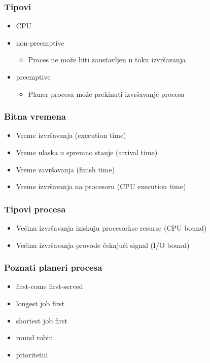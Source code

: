 \documentclass{beamer}
\begin{document}
\begin{frame}
    \frametitle{Tipovi}
    \begin{itemize}
        \item CPU \newline
        \item non-preemptive \begin{itemize}
            \item Proces ne može biti zaustavljen u toku izvršavanja \newline
        \end{itemize}
        \item preemptive \begin{itemize}
            \item Planer procesa može prekinuti izvršavanje procesa
        \end{itemize}
    \end{itemize}
\end{frame}

\begin{frame}
    \frametitle{Bitna vremena}
    \begin{itemize}
        \item Vreme izvršavanja (execution time) \newline
        \item Vreme ulaska u spremno stanje (arrival time) \newline
        \item Vreme završavanja (finish time) \newline
        \item Vreme izvršavanja na procesoru (CPU execution time)
    \end{itemize}
\end{frame}

\begin{frame}
    \frametitle{Tipovi procesa}
    \begin{itemize}
        \item Većinu izvršavanja iziskuju procesorkse resurse (CPU bound) \newline
        \item Većinu izvršavanja provode čekajući signal (I/O bound)
    \end{itemize}
\end{frame}

\begin{frame}
    \frametitle{Poznati planeri procesa}
    \begin{itemize}
        \item first-come first-served \newline
        \item longest job first \newline
        \item shortest job first \newline
        \item round robin \newline
        \item prioritetni
    \end{itemize}
\end{frame}
\end{document}
